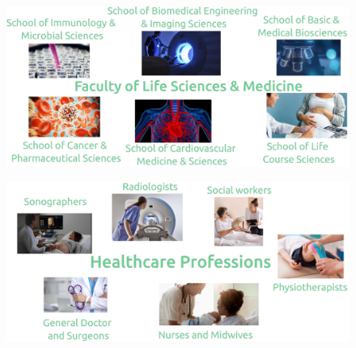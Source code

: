
{
\begin{frame}{}

  \begin{figure}
  \centering
  \includegraphics[width=1.0\textwidth]{./../figures/schools-at-life-science-and-medicine/versions/drawing-v00}
  \end{figure}

\end{frame}
}



{
\begin{frame}{}

  \begin{figure}
  \centering
  \includegraphics[width=1.0\textwidth]{./../figures/healthcare-professionals/versions/drawing-v02}
  \end{figure}

\end{frame}
}


